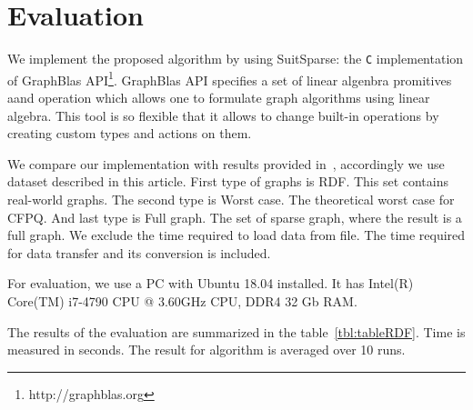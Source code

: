 \section{Evaluation}

We implement the proposed algorithm by using SuitSparse: the \verb|C| implementation of GraphBlas API\footnote{http://graphblas.org}. GraphBlas API specifies a set of linear algenbra promitives aand operation which allows one to formulate graph algorithms using linear algebra. This tool is so flexible that it allows to change built-in operations by creating custom types and actions on them.


We compare our implementation with results provided in~\cite{10.1145/3327964.3328503}, accordingly we use dataset described in this article. First type of graphs is RDF. This set contains real-world graphs. The second type is Worst case. The theoretical worst case for CFPQ. And last type is Full graph. The set of sparse graph, where the result is a full graph. We exclude the time required to load data from file. The time required for data transfer and its conversion is included.

For evaluation, we use a PC with Ubuntu 18.04 installed. It has Intel(R) Core(TM) i7-4790 CPU @ 3.60GHz CPU, DDR4 32 Gb RAM.



The results of the evaluation are summarized in the table~\ref{tbl:tableRDF}.
Time is measured in seconds. The result for algorithm is averaged over 10 runs.

